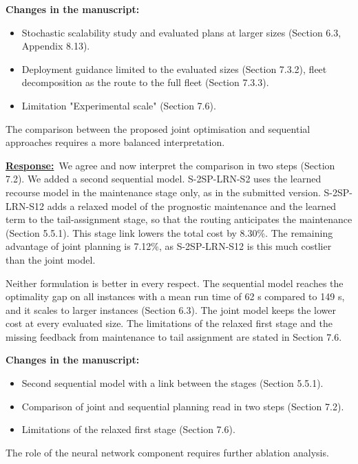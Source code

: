 \documentclass{article}
\newcommand{\response}{\vspace{0.1cm}\noindent\underline{\textbf{Response:}}\ }
\newcommand{\changes}{\vspace{0.1cm}\noindent\textbf{Changes in the manuscript:}}
\begin{document}
\changes
\begin{itemize}[nosep]
\item Stochastic scalability study and evaluated plans at larger sizes (Section 6.3, Appendix 8.13).
\item Deployment guidance limited to the evaluated sizes (Section 7.3.2), fleet decomposition as the route to the full fleet (Section 7.3.3).
\item Limitation "Experimental scale" (Section 7.6).
\end{itemize}

\begin{cmt}{}{}
The comparison between the proposed joint optimisation and sequential approaches requires a more balanced interpretation.
\end{cmt}

\response We agree and now interpret the comparison in two steps (Section 7.2). We added a second sequential model. S-2SP-LRN-S2 uses the learned recourse model in the maintenance stage only, as in the submitted version. S-2SP-LRN-S12 adds a relaxed model of the prognostic maintenance and the learned term to the tail-assignment stage, so that the routing anticipates the maintenance (Section 5.5.1). This stage link lowers the total cost by 8.30\%. The remaining advantage of joint planning is 7.12\%, as S-2SP-LRN-S12 is this much costlier than the joint model.

Neither formulation is better in every respect. The sequential model reaches the optimality gap on all instances with a mean run time of 62 s compared to 149 s, and it scales to larger instances (Section 6.3). The joint model keeps the lower cost at every evaluated size. The limitations of the relaxed first stage and the missing feedback from maintenance to tail assignment are stated in Section 7.6.

\changes
\begin{itemize}[nosep]
\item Second sequential model with a link between the stages (Section 5.5.1).
\item Comparison of joint and sequential planning read in two steps (Section 7.2).
\item Limitations of the relaxed first stage (Section 7.6).
\end{itemize}

\begin{cmt}{}{}
The role of the neural network component requires further ablation analysis.
\end{cmt}
\end{document}
